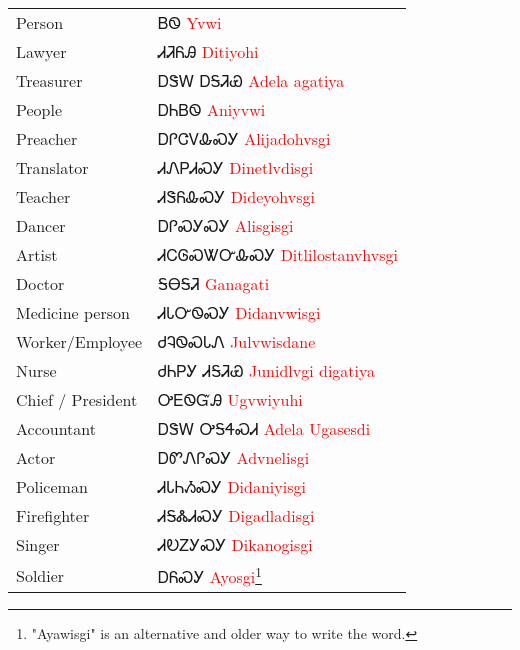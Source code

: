 \begin{minipage}{\linewidth}
\begin{tabular}{p{3cm} p{11cm}}
Person & ᏴᏫ 
 \newline \textcolor{red}{Yvwi}\\
Lawyer & ᏗᏘᏲᎯ 
 \newline \textcolor{red}{Ditiyohi}\\
Treasurer & ᎠᏕᎳ ᎠᎦᏘᏯ 
 \newline \textcolor{red}{Adela agatiya}\\
People & ᎠᏂᏴᏫ 
 \newline \textcolor{red}{Aniyvwi}\\
Preacher & ᎠᎵᏣᏙᎲᏍᎩ 
 \newline \textcolor{red}{Alijadohvsgi}\\
Translator & ᏗᏁᏢᏗᏍᎩ 
 \newline \textcolor{red}{Dinetlvdisgi}\\
Teacher & ᏗᏕᏲᎲᏍᎩ 
 \newline \textcolor{red}{Dideyohvsgi}\\
Dancer & ᎠᎵᏍᎩᏍᎩ 
 \newline \textcolor{red}{Alisgisgi}\\
Artist & ᏗᏟᎶᏍᏔᏅᎲᏍᎩ 
 \newline \textcolor{red}{Ditlilostanvhvsgi}\\
Doctor & ᎦᎾᎦᏘ 
 \newline \textcolor{red}{Ganagati}\\
Medicine person & ᏗᏓᏅᏫᏍᎩ 
 \newline \textcolor{red}{Didanvwisgi}\\
Worker/Employee & ᏧᎸᏫᏍᏓᏁ 
 \newline \textcolor{red}{Julvwisdane}\\
Nurse & ᏧᏂᏢᎩ ᏗᎦᏘᏯ 
 \newline \textcolor{red}{Junidlvgi digatiya}\\
Chief / President & ᎤᎬᏫᏳᎯ 
 \newline \textcolor{red}{Ugvwiyuhi}\\
Accountant & ᎠᏕᎳ ᎤᎦᏎᏍᏗ 
 \newline \textcolor{red}{Adela Ugasesdi}\\
Actor & ᎠᏛᏁᎵᏍᎩ 
 \newline \textcolor{red}{Advnelisgi}\\
Policeman & ᏗᏓᏂᏱᏍᎩ 
 \newline \textcolor{red}{Didaniyisgi}\\
Firefighter & ᏗᎦᏜᏗᏍᎩ 
 \newline \textcolor{red}{Digadladisgi}\\
Singer & ᏗᎧᏃᎩᏍᎩ 
 \newline \textcolor{red}{Dikanogisgi}\\
Soldier & ᎠᏲᏍᎩ 
 \newline \textcolor{red}{Ayosgi}\footnote{"Ayawisgi" is an alternative and older way to write the word.}\\
\end{tabular}
\end{minipage}

